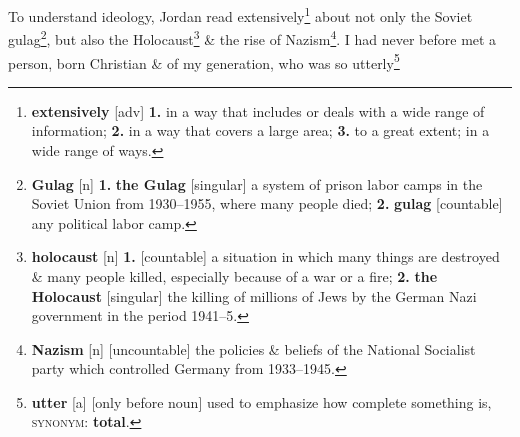 \documentclass[oneside]{book}
\numberwithin{equation}{section}
\begin{document}
To understand ideology, Jordan read extensively\footnote{\textbf{extensively} [adv] \textbf{1.} in a way that includes or deals with a wide range of information; \textbf{2.} in a way that covers a large area; \textbf{3.} to a great extent; in a wide range of ways.} about not only the Soviet gulag\footnote{\textbf{Gulag} [n] \textbf{1.} \textbf{the Gulag} [singular] a system of prison labor camps in the Soviet Union from 1930--1955, where many people died; \textbf{2.} \textbf{gulag} [countable] any political labor camp.}, but also the Holocaust\footnote{\textbf{holocaust} [n] \textbf{1.} [countable] a situation in which many things are destroyed \& many people killed, especially because of a war or a fire; \textbf{2.} \textbf{the Holocaust} [singular] the killing of millions of Jews by the German Nazi government in the period 1941--5.} \& the rise of Nazism\footnote{\textbf{Nazism} [n] [uncountable] the policies \& beliefs of the National Socialist party which controlled Germany from 1933--1945.}. I had never before met a person, born Christian \& of my generation, who was so utterly\footnote{\textbf{utter} [a] [only before noun] used to emphasize how complete something is, \textsc{synonym}: \textbf{total}.

}
\end{document}
